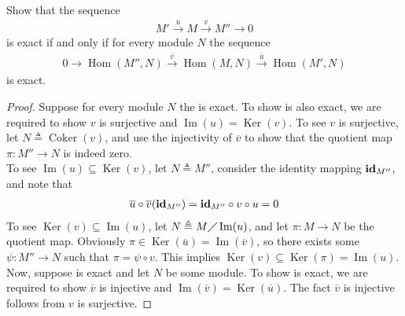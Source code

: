 \documentclass{report}
\begin{document}
\begin{question}{}{}
Show that the sequence 
\begin{align}
\label{Mu}
M'\overset{u}{\longrightarrow }M  \overset{v}{\longrightarrow }M''\longrightarrow 0
\end{align}
is exact if and only if for every module $N$ the sequence 
\begin{align}
\label{Ns}
0\longrightarrow \operatorname{Hom}(M'',N)\overset{\overline{v}}{\longrightarrow }\operatorname{Hom}(M,N) \overset{\overline{u}}{\longrightarrow } \operatorname{Hom}(M',N)
\end{align}
is exact. 
\end{question}
\begin{proof}
Suppose for every module $N$ the  is exact. To show   is also exact, we are required to show $v$ is surjective and $\operatorname{Im}(u)=\operatorname{Ker}(v)$. To see $v$ is surjective, let $N\triangleq \operatorname{Coker}(v)$, and use the injectivity of $\overline{v}$ to show that the quotient map $\pi: M''\rightarrow N$ is indeed zero. \\

To see $\operatorname{Im}(u)\subseteq \operatorname{Ker}(v)$, let $N\triangleq M''$, consider the identity mapping $\text{\textbf{id}} _{M''}$, and note that 
\begin{align*}
\overline{u}\circ \overline{v} (\text{\textbf{id}} _{M''}) = \text{\textbf{id}} _{M''} \circ v \circ  u = 0
\end{align*}
To see $\operatorname{Ker}(v)\subseteq \operatorname{Im}(u)$, let $N\triangleq  M\diagup \operatorname{Im}(u)$, and let $\pi :M\rightarrow N$ be the quotient map. Obviously $\pi  \in \operatorname{Ker}(\overline{u})=\operatorname{Im}(\overline{v})$, so there exists some $\psi : M''\rightarrow N$ such that $\pi = \psi \circ v $. This implies $\operatorname{Ker}(v)\subseteq \operatorname{Ker}(\pi )=\operatorname{Im}(u)$. \\

Now, suppose  is exact and let $N$ be some module. To show  is exact, we are required to show $\overline{v}$ is injective and $\operatorname{Im}(\overline{v})=\operatorname{Ker}(\overline{u})$. The fact $\overline{v}$ is injective follows from $v$ is surjective.   








\end{proof}
\end{document}

